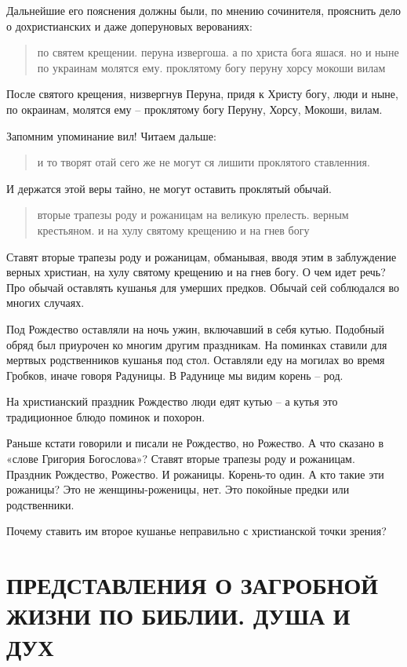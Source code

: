 \documentclass[a5paper,11pt,openany]{article}
\begin{document}
   Дальнейшие его пояснения должны были, по мнению сочинителя, прояснить дело о дохристианских и даже доперуновых верованиях:

\begin{quotation}
\noindent по святем крещении. перуна извергоша. а по христа бога яшася. но и ныне по украинам молятся ему. проклятому богу перуну хорсу мокоши вилам
\end{quotation}

   После святого крещения, низвергнув Перуна, придя к Христу богу, люди и ныне, по окраинам, молятся ему – проклятому богу Перуну, Хорсу, Мокоши, вилам.

   Запомним упоминание вил! Читаем дальше:

\begin{quotation}
\noindent и то творят отай сего же не могут ся лишити проклятого ставленния.
\end{quotation}

И держатся этой веры тайно, не могут оставить проклятый обычай. 

\begin{quotation}
\noindent вторые трапезы роду и рожаницам на великую прелесть. верным крестьяном. и на хулу святому крещению и на гнев богу 
\end{quotation}

   Ставят вторые трапезы роду и рожаницам, обманывая, вводя этим в заблуждение верных христиан, на хулу святому крещению и на гнев богу. О чем идет речь? Про обычай оставлять кушанья для умерших предков. Обычай сей соблюдался во многих случаях. 

   Под Рождество оставляли на ночь ужин, включавший в себя кутью. Подобный обряд был приурочен ко многим другим праздникам. На поминках ставили для мертвых родственников кушанья под стол. Оставляли еду на могилах во время Гробков, иначе говоря Радуницы. В Радунице мы видим корень – род.

   На христианский праздник Рождество люди едят кутью – а кутья это традиционное блюдо  поминок и похорон.

   Раньше кстати говорили и писали не Рождество, но Рожество. А что сказано в «слове Григория Богослова»? Ставят вторые трапезы роду и рожаницам. Праздник Рождество, Рожество. И рожаницы. Корень-то один. А кто такие эти рожаницы? Это не женщины-роженицы, нет. Это покойные предки или родственники.

   Почему ставить им второе кушанье неправильно с христианской точки зрения?

\section{ПРЕДСТАВЛЕНИЯ О ЗАГРОБНОЙ ЖИЗНИ ПО БИБЛИИ. ДУША И ДУХ}
\end{document}
